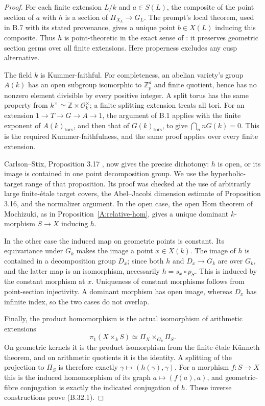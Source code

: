 \begin{proof}
For each finite extension $L/k$ and $a\in S(L)$,
the composite of the point section of $a$ with $h$
is a section of $\Pi_{X_L}\to G_L$.
The prompt's local theorem, used in B.7 with its
stated provenance, gives a unique point
$b\in X(L)$ inducing this composite. Thus $h$ is
point-theoretic in the exact sense of
\cite[Definition 3.2]{B_CarlsonStix}: it preserves
geometric section germs over all finite extensions.
Here properness excludes any cusp alternative.

The field $k$ is Kummer-faithful. For completeness,
an abelian variety's group $A(k)$ has an open
subgroup isomorphic to $\mathbb Z_p^d$ and finite
quotient, hence has no nonzero element divisible
by every positive integer. A split torus has the
same property from
$k^\times\simeq\mathbb Z\times\mathcal O_k^\times$;
a finite splitting extension treats all tori.
For an extension $1\to T\to G\to A\to1$, the
argument of B.1 applies with the finite exponent
of $A(k)_{\mathrm{tors}}$, and then that of
$G(k)_{\mathrm{tors}}$, to give
$\bigcap_n nG(k)=0$. This is the required
Kummer-faithfulness, and the same proof applies
over every finite extension.

Carlson--Stix, Proposition 3.17
\cite{B_CarlsonStix}, now gives the precise
dichotomy: $h$ is open, or its image is contained
in one point decomposition group. We use the
hyperbolic-target range of that proposition.
Its proof was checked at the use of arbitrarily
large finite-\'etale target covers, the
Abel--Jacobi dimension estimate of Proposition 3.16,
and the normalizer argument.
In the open case, the open Hom theorem of
Mochizuki, as in Proposition~\ref{A:relative-hom}, gives a unique dominant
$k$-morphism $S\to X$ inducing $h$.

In the other case the induced map on geometric
points is constant. Its equivariance under
$G_k$ makes the image a point $x\in X(k)$.
The image of $h$ is contained in a decomposition
group $D_x$; since both $h$ and $D_x\to G_k$
are over $G_k$, and the latter map is an
isomorphism, necessarily
$h=s_x\circ p_S$. This is induced by the
constant morphism at $x$.
Uniqueness of constant morphisms follows from
point-section injectivity. A dominant morphism
has open image, whereas $D_x$ has infinite
index, so the two cases do not overlap.

Finally, the product homomorphism is the actual
isomorphism of arithmetic extensions
\[
 \pi_1(X\times_k S)
       \simeq \Pi_X\times_{G_k}\Pi_S.
\]
On geometric kernels it is the product
isomorphism from the finite-\'etale K\"unneth
theorem, and on arithmetic quotients it is the
identity. A splitting of the projection to
$\Pi_S$ is therefore exactly
$\gamma\mapsto(h(\gamma),\gamma)$.
For a morphism $f:S\to X$ this is the induced
homomorphism of its graph
$a\mapsto(f(a),a)$, and geometric-fibre
conjugation is exactly the indicated conjugation
of $h$. These inverse constructions prove
(B.32.1).
\end{proof}

